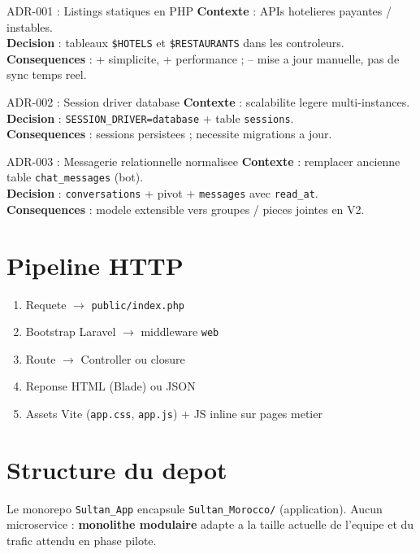 \begin{infobox}{ADR-001 : Listings statiques en PHP}
\textbf{Contexte} : APIs hotelieres payantes / instables.\\
\textbf{Decision} : tableaux \texttt{\$HOTELS} et \texttt{\$RESTAURANTS} dans les controleurs.\\
\textbf{Consequences} : + simplicite, + performance ; -- mise a jour manuelle, pas de sync temps reel.
\end{infobox}

\begin{infobox}{ADR-002 : Session driver database}
\textbf{Contexte} : scalabilite legere multi-instances.\\
\textbf{Decision} : \texttt{SESSION\_DRIVER=database} + table \texttt{sessions}.\\
\textbf{Consequences} : sessions persistees ; necessite migrations a jour.
\end{infobox}

\begin{infobox}{ADR-003 : Messagerie relationnelle normalisee}
\textbf{Contexte} : remplacer ancienne table \texttt{chat\_messages} (bot).\\
\textbf{Decision} : \texttt{conversations} + pivot + \texttt{messages} avec \texttt{read\_at}.\\
\textbf{Consequences} : modele extensible vers groupes / pieces jointes en V2.
\end{infobox}

\section{Pipeline HTTP}

\begin{enumerate}
  \item Requete $\rightarrow$ \texttt{public/index.php}
  \item Bootstrap Laravel $\rightarrow$ middleware \texttt{web}
  \item Route $\rightarrow$ Controller ou closure
  \item Reponse HTML (Blade) ou JSON
  \item Assets Vite (\texttt{app.css}, \texttt{app.js}) + JS inline sur pages metier
\end{enumerate}

\routesPie
\dataFlowDiagram
\deployDiagram

\section{Structure du depot}

Le monorepo \texttt{Sultan\_App} encapsule \texttt{Sultan\_Morocco/} (application). Aucun microservice : \textbf{monolithe modulaire} adapte a la taille actuelle de l'equipe et du trafic attendu en phase pilote.
